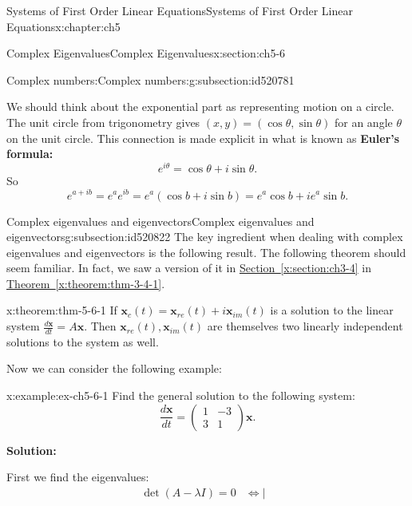 \documentclass[oneside,10pt,]{book}
\newcommand{\xreffont}{\relax}
\newcommand{\terminology}[1]{\textbf{#1}}
\numberwithin{equation}{section}
\numberwithin{equation}{section}
\newcommand{\amp}{&}
\begin{document}
\begin{chapterptx}{Systems of First Order Linear Equations}{}{Systems of First Order Linear Equations}{}{}{x:chapter:ch5}
\begin{sectionptx}{Complex Eigenvalues}{}{Complex Eigenvalues}{}{}{x:section:ch5-6}
\begin{subsectionptx}{Complex numbers:}{}{Complex numbers:}{}{}{g:subsection:id520781}
\par
We should think about the exponential part as representing motion on a circle. The unit circle from trigonometry gives \((x,y) = (\cos \theta, \sin \theta)\) for an angle \(\theta\) on the unit circle. This connection is made explicit in what is known as \terminology{Euler's formula:}%
\begin{equation}
e^{i\theta}=\cos \theta+i\sin \theta.\label{x:men:Euler-chpt5}
\end{equation}
So%
\begin{equation*}
e^{a+ib}=e^{a}e^{ib}=e^{a}\left(\cos b+i\sin b\right)=e^{a}\cos b+ie^{a}\sin b.
\end{equation*}
%
\end{subsectionptx}
%
%
\typeout{************************************************}
\typeout{************************************************}
%
\begin{subsectionptx}{Complex eigenvalues and eigenvectors}{}{Complex eigenvalues and eigenvectors}{}{}{g:subsection:id520822}
The key ingredient when dealing with complex eigenvalues and eigenvectors is the following result. The following theorem should seem familiar. In fact, we saw a version of it in \hyperref[x:section:ch3-4]{Section~{\xreffont\ref{x:section:ch3-4}}} in \hyperref[x:theorem:thm-3-4-1]{Theorem~{\xreffont\ref{x:theorem:thm-3-4-1}}}.%
\begin{theorem}{}{}{x:theorem:thm-5-6-1}%
If \(\mathbf{x}_{c}(t)=\mathbf{x}_{re}(t)+i\mathbf{x}_{im}(t)\) is a solution to the linear system \(\frac{d\mathbf{x}}{dt}=A\mathbf{x}\). Then \(\mathbf{x}_{re}(t),\mathbf{x}_{im}(t)\) are themselves two linearly independent solutions to the system as well.%
\end{theorem}
Now we can consider the following example:%
\begin{example}{}{x:example:ex-ch5-6-1}%
Find the general solution to the following system:%
\begin{equation*}
\frac{d\mathbf{x}}{dt}=\left(\begin{array}{cc}
1 \amp -3\\
3 \amp 1
\end{array}\right)\mathbf{x}.
\end{equation*}
%
\par
\terminology{Solution:}%
\par
First we find the eigenvalues:%
\begin{align*}
\det\left(A-\lambda I\right)=0 \amp \iff\left|\begin{array}{cc}

\end{array}
\end{align*}
\end{example}
\end{subsectionptx}
\end{sectionptx}
\end{chapterptx}
\end{document}
